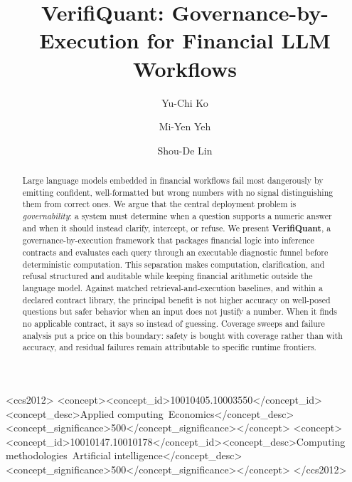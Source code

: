 \documentclass[sigconf]{acmart}
\begin{document}
\title{VerifiQuant: Governance-by-Execution for Financial LLM Workflows}

\author{Yu-Chi Ko}

\author{Mi-Yen Yeh}
\author{Shou-De Lin}

\renewcommand{\shortauthors}{Ko et al.}

\begin{abstract}
Large language models embedded in financial workflows fail most dangerously by emitting confident, well-formatted but wrong numbers with no signal distinguishing them from correct ones.
We argue that the central deployment problem is \emph{governability}: a system must determine when a question supports a numeric answer and when it should instead clarify, intercept, or refuse.
We present \textbf{VerifiQuant}, a governance-by-execution framework that packages financial logic into inference contracts and evaluates each query through an executable diagnostic funnel before deterministic computation.
This separation makes computation, clarification, and refusal structured and auditable while keeping financial arithmetic outside the language model.
Against matched retrieval-and-execution baselines, and within a declared contract library, the principal benefit is not higher accuracy on well-posed questions but safer behavior when an input does not justify a number.
When it finds no applicable contract, it says so instead of guessing.
Coverage sweeps and failure analysis put a price on this boundary: safety is bought with coverage rather than with accuracy, and residual failures remain attributable to specific runtime frontiers.
\end{abstract}

\begin{CCSXML}
<ccs2012>
<concept><concept_id>10010405.10003550</concept_id><concept_desc>Applied computing~Economics</concept_desc><concept_significance>500</concept_significance></concept>
<concept><concept_id>10010147.10010178</concept_id><concept_desc>Computing methodologies~Artificial intelligence</concept_desc><concept_significance>500</concept_significance></concept>
</ccs2012>
\end{CCSXML}
\end{document}
